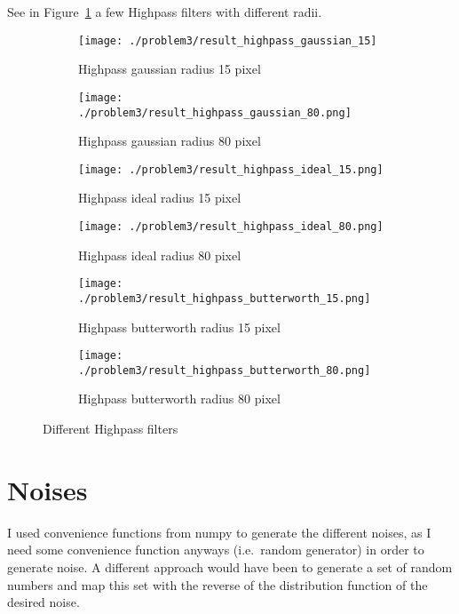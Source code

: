 \documentclass[a4paper]{scrartcl}
\begin{document}
See in Figure~\ref{fig:highpassfilters} a few Highpass filters with different radii. %

\begin{figure}[h]
    \centering
    \begin{subfigure}[t]{0.4\textwidth}
      \texttt{[image: ./problem3/result\_highpass\_gaussian\_15]}
        \caption{Highpass gaussian radius 15 pixel}
    \end{subfigure}
    \begin{subfigure}[t]{0.4\textwidth}
      \texttt{[image: ./problem3/result\_highpass\_gaussian\_80.png]}
        \caption{Highpass gaussian radius 80 pixel}
    \end{subfigure}
    \begin{subfigure}[t]{0.4\textwidth}
      \texttt{[image: ./problem3/result\_highpass\_ideal\_15.png]}
        \caption{Highpass ideal radius 15 pixel}
    \end{subfigure}
    \begin{subfigure}[t]{0.4\textwidth}
      \texttt{[image: ./problem3/result\_highpass\_ideal\_80.png]}
        \caption{Highpass ideal radius 80 pixel}
    \end{subfigure}
    \begin{subfigure}[t]{0.4\textwidth}
      \texttt{[image: ./problem3/result\_highpass\_butterworth\_15.png]}
        \caption{Highpass butterworth radius 15 pixel}
    \end{subfigure}
    \begin{subfigure}[t]{0.4\textwidth}
      \texttt{[image: ./problem3/result\_highpass\_butterworth\_80.png]}
        \caption{Highpass butterworth radius 80 pixel}
    \end{subfigure}

    \caption{Different Highpass filters}
    \label{fig:highpassfilters}
\end{figure}

\section{Noises}

I used convenience functions from numpy to generate the different noises, as I need some convenience function anyways (i.e.\ random generator) in order to generate noise. A different approach would have been to generate a set of random numbers and map this set with the reverse of the distribution function of the desired noise.
\end{document}
